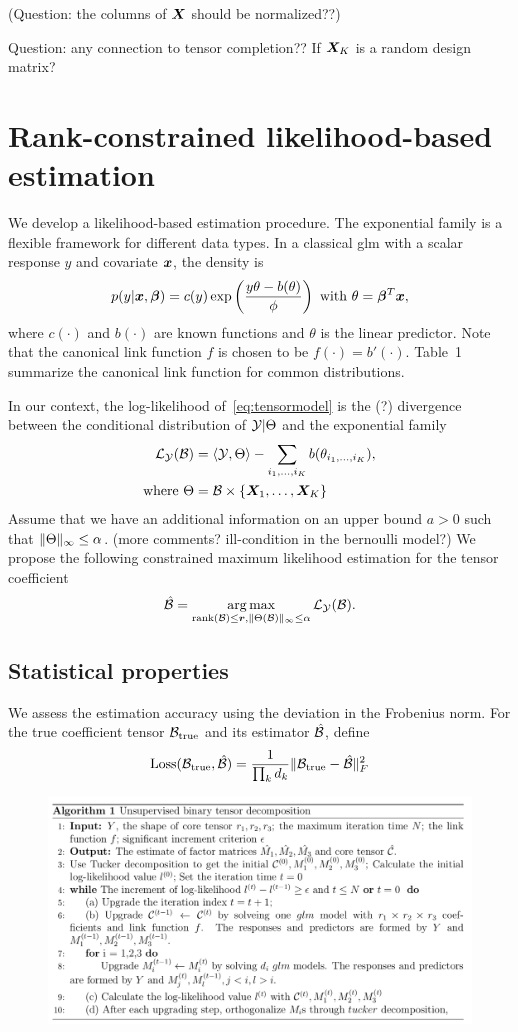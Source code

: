 \documentclass[twoside]{article}
\theoremstyle{plain}
\theoremstyle{definition}
\begin{document}
(Question: the columns of $\bm X$ should be normalized??)

Question: any connection to tensor completion?? If $\bm X_K$ is a random design matrix? 

\section{Rank-constrained likelihood-based estimation}
We develop a likelihood-based estimation procedure. The exponential family is a flexible framework for different data types. In a classical glm with a scalar response $y$ and covariate $\bm x$, the density is 
\[
p(y|\bm x, \boldsymbol{\beta})=c(y)\exp\left({y\theta- b(\theta) \over \phi}\right)\ \text{with}\ \theta=\boldsymbol{\beta}^T\bm x,
\]
where $c(\cdot)$ and $b(\cdot)$ are known functions and $\theta$ is the linear predictor. Note that the canonical link function $f$ is chosen to be $f(\cdot)=b'(\cdot)$. Table~1 summarize the canonical link function for common distributions. 

In our context, the log-likelihood of~\eqref{eq:tensormodel} is the (?) divergence between the conditional distribution of $\mathcal{Y}|\Theta$ and the exponential family
\begin{align}
\mathcal{L}_{\mathcal{Y}}(\mathcal{B})&=\langle \mathcal{Y}, \Theta \rangle - \sum_{i_1,\ldots,i_K} b(\theta_{i_1,\ldots,i_K}),\\
\text{where}\ \Theta&=\mathcal{B}\times\{\bm X_1,\ldots,\bm X_K\}
\end{align}
Assume that we have an additional information on an upper bound $a>0$ such that $\lVert\Theta\rVert_\infty\leq \alpha$. (more comments? ill-condition in the bernoulli model?)
We propose the following constrained maximum likelihood estimation for the tensor coefficient
\[
\hat {\mathcal{B}}=\operatorname*{arg\,max}_{\text{rank}(\mathcal{B})\leq \bm{r}, \lVert\Theta(\mathcal{B})\rVert_\infty\leq \alpha} \mathcal{L}_{\mathcal{Y}}(\mathcal{B}).
\]
\subsection{Statistical properties}
We assess the estimation accuracy using the deviation in the Frobenius norm. For the true coefficient tensor $\mathcal{B}_{\text{true}}$ and its estimator $\hat {\mathcal{B}}$, define
\[
\text{Loss}(\mathcal{B}_{\text{true}}, \hat {\mathcal{B}})={ 1 \over \prod_k d_k} \lVert\mathcal{B}_{\text{true}}- \hat {\mathcal{B}}\rVert_F^2
\]

\begin{figure}
\begin{center}
\includegraphics[width=17.5cm]{unsupervised.png}
  \end{center}
  \end{figure}
  
\end{document}
